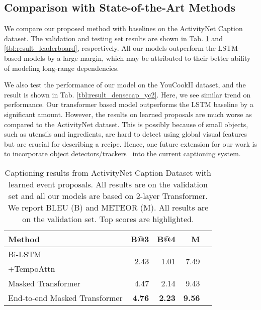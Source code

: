 \documentclass[10pt,twocolumn,letterpaper]{article}
\begin{document}
\subsection{Comparison with State-of-the-Art Methods}
We compare our proposed method with baselines on the ActivityNet Caption dataset. The validation and testing set results are shown in Tab. \ref{tbl:result_densecap} and \ref{tbl:result_leaderboard}, respectively. All our models outperform the LSTM-based models by a large margin, which may be attributed to their better ability of modeling long-range dependencies. 

We also test the performance of our model on the YouCookII dataset, and the result is shown in Tab. \ref{tbl:result_densecap_yc2}. Here, we see similar trend on performance. Our transformer based model outperforms the LSTM baseline by a significant amount. 
However, the results on learned proposals are much worse as compared to the ActivityNet dataset. 
This is possibly because of small objects, such as utensils and ingredients, are hard to detect using global visual features but are crucial for describing a recipe. Hence, one future extension for our work is to incorporate object detectors/trackers~\cite{yu2015compositional,yu2013grounded} into the current captioning system.

\begin{table}[t]
\centering
\caption{Captioning results from ActivityNet Caption Dataset with learned event proposals. All results are on the validation set and all our models are based on 2-layer Transformer. We report BLEU (B) and METEOR (M). All results are on the validation set. Top scores are highlighted.}
\label{tbl:result_densecap}
    {\small
\begin{tabular}{lrrrr}
\toprule
Method & B@3 & B@4 & M \\ \midrule
Bi-LSTM & \multirow{2}{*}{2.43} & \multirow{2}{*}{1.01} & \multirow{2}{*}{7.49} \\
+TempoAttn \\\midrule
Masked Transformer & 4.47 & 2.14 & 9.43 \\
End-to-end Masked Transformer & \textbf{4.76} & \textbf{2.23} & \textbf{9.56} \\
\bottomrule
\end{tabular}
    }
    \vspace{-8pt}
\end{table}
\end{document}
